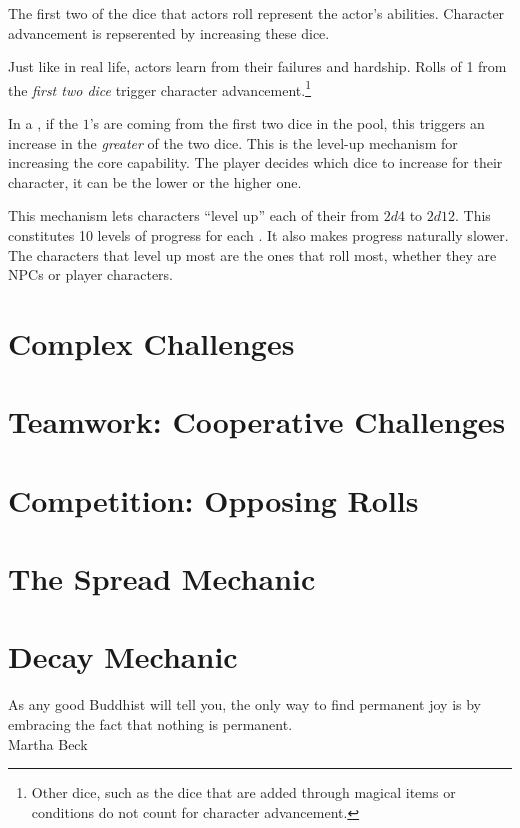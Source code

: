 \label{subsec:character_advancement}

The first two of the dice that actors roll represent the actor's abilities.
Character advancement is repserented by increasing these dice.

Just like in real life, actors learn from their failures and hardship.
Rolls of 1 from the \emph{first two dice} trigger character advancement.\footnote{Other dice, such as the dice that are added through magical items or conditions do not count for character advancement.}

In a , if the $1$'s are coming from the first two dice in the pool, this
triggers an increase in the \emph{greater} of the two dice. This is the level-up mechanism
for increasing the core capability. The player decides which dice to increase for their
character, it can be the lower or the higher one.

This mechanism lets characters ``level up'' each of their  from $2d4$ to $2d12$.
This constitutes 10 levels of progress for each .
It also makes progress naturally slower.
The characters that level up most are the ones that roll most, whether they are NPCs or player characters.

\section{Complex Challenges}

\section{Teamwork: Cooperative Challenges}


\section{Competition: Opposing Rolls}

\section{The Spread Mechanic}

\section{Decay Mechanic}

\begin{emphasisParagraph}
As any good Buddhist will tell you, the only way to find permanent joy is by embracing the fact that nothing is permanent.\\
Martha Beck
\end{emphasisParagraph}

